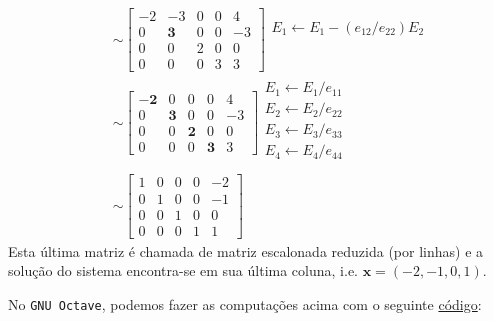 \begin{ex}
\begin{align}
\begin{array}{l}
      \\
    \end{array}\\
    &\sim       
      \begin{bmatrix}
        -2 & -3 & 0 & 0 & 4\\
        0 & \pmb{3} & 0 & 0 & -3\\
        0 & 0 & 2 & 0 & 0\\
        0 & 0 & 0 & 3 & 3
      \end{bmatrix}
      \begin{array}{l}
      E_1 \leftarrow E_1 - (e_{12}/e_{22})E_2\\
      \\
      \\
      \\
    \end{array}\\
    &\sim       
      \begin{bmatrix}
        \pmb{-2} & 0 & 0 & 0 & 4\\
        0 & \pmb{3} & 0 & 0 & -3\\
        0 & 0 & \pmb{2} & 0 & 0\\
        0 & 0 & 0 & \pmb{3} & 3
      \end{bmatrix}
      \begin{array}{l}
      E_1 \leftarrow E_1/e_{11}\\
      E_2 \leftarrow E_2/e_{22}\\
      E_3 \leftarrow E_3/e_{33}\\
      E_4 \leftarrow E_4/e_{44}\\
    \end{array}\\
    &\sim       
      \begin{bmatrix}
        1 & 0 & 0 & 0 & -2\\
        0 & 1 & 0 & 0 & -1\\
        0 & 0 & 1 & 0 & 0\\
        0 & 0 & 0 & 1 & 1
      \end{bmatrix}
  \end{align}
Esta última matriz é chamada de matriz escalonada reduzida (por linhas) e a solução do sistema encontra-se em sua última coluna, i.e. $\pmb{x} = (-2, -1, 0, 1)$.

\ifisoctave
No \verb+GNU Octave+, podemos fazer as computações acima com o seguinte \href{https://github.com/phkonzen/notas/blob/master/src/MatematicaNumerica/cap_sl_direto/dados/ex_egauss_reduzida/ex_egauss_reduzida.m}{código}:

\fi
\end{ex}

